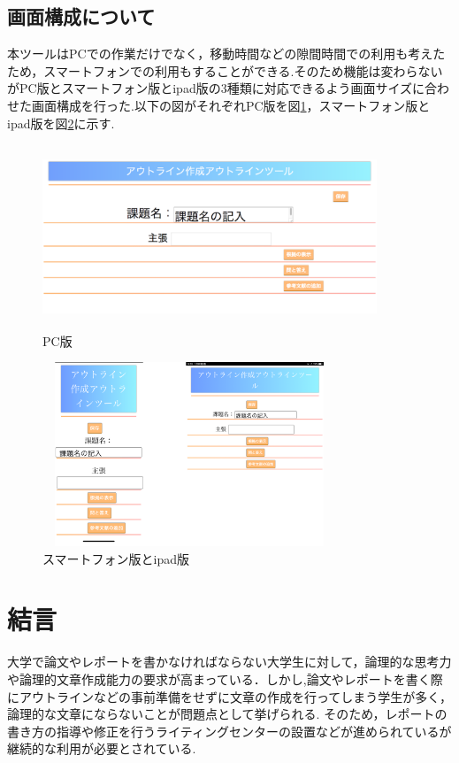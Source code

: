 \documentclass[a4j,12pt]{jarticle}
\begin{document}
\newpage
\subsection{画面構成について}
本ツールはPCでの作業だけでなく，移動時間などの隙間時間での利用も考えたため，スマートフォンでの利用もすることができる.そのため機能は変わらないがPC版とスマートフォン版とipad版の3種類に対応できるよう画面サイズに合わせた画面構成を行った.以下の図がそれぞれPC版を図\ref{fig:p}，スマートフォン版とipad版を図\ref{fig:q}に示す.
\begin{figure}[h]
\begin{center}
 \includegraphics[clip,width=100mm,height=55mm]{figure/08gamen.png}
\end{center}
 \caption{PC版}
 \label{fig:p}
\end{figure}

\begin{figure}[h]
\begin{center}
 \includegraphics[clip,width=88mm,height=55mm]{figure/17.png}
\end{center}
 \caption{スマートフォン版とipad版}
 \label{fig:q}
\end{figure}
\newpage

\section{結言}
大学で論文やレポートを書かなければならない大学生に対して，論理的な思考力や論理的文章作成能力の要求が高まっている．しかし,論文やレポートを書く際にアウトラインなどの事前準備をせずに文章の作成を行ってしまう学生が多く，論理的な文章にならないことが問題点として挙げられる.
そのため，レポートの書き方の指導や修正を行うライティングセンターの設置などが進められているが継続的な利用が必要とされている.
\end{document}

